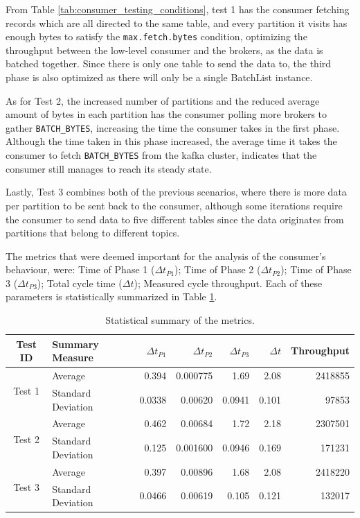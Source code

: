 From Table \ref{tab:consumer_testing_conditions}, test 1 has the consumer
fetching records which are all directed to the same table, and every partition
it visits has enough bytes to satisfy the \lstinline{max.fetch.bytes} condition,
optimizing the throughput between the low-level consumer and the brokers, as the
data is batched together. Since there is only one table to send the data to, the
third phase is also optimized as there will only be a single BatchList instance.

As for Test 2, the increased number of partitions and the reduced average amount
of bytes in each partition has the consumer polling more brokers to gather
\lstinline{BATCH_BYTES}, increasing the time the consumer takes in the first
phase. Although the time taken in this phase increased, the average time it takes
the consumer to fetch \lstinline{BATCH_BYTES} from the kafka cluster, indicates
that the consumer still manages to reach its steady state.

Lastly, Test 3 combines both of the previous scenarios, where there is more data
per partition to be sent back to the consumer, although some iterations require
the consumer to send data to five different tables since the data originates from
partitions that belong to different topics.

The metrics that were deemed important for the analysis of the consumer's
behaviour, were: Time of Phase 1 ($\Delta t_{P1}$); Time of Phase 2 ($\Delta
t_{P2}$); Time of Phase 3 ($\Delta t_{P3}$); Total cycle time ($\Delta t$);
Measured cycle throughput. Each of these parameters is statistically summarized
in Table \ref{tab:consumer_results}.
\begin{table}[htb!] 
\centering 
\caption{Statistical summary of the metrics.}
\label{tab:consumer_results}
    \begin{tabular}{ |c|l|r|r|r|r|r| } 
        \hline 
        \textbf{Test ID} & \textbf{Summary Measure} & \textbf{$\Delta t_{P1}$} &
            \textbf{$\Delta t_{P2}$} & \textbf{$\Delta t_{P3}$} & \textbf{$\Delta t$} & \textbf{Throughput} \\ 
            \hline
            \multirow{2}{*}{Test 1} 
            & Average & 0.394  & 0.000775 & 1.69 & 2.08 & 2418855 \\ 
            & Standard Deviation & 0.0338 & 0.00620  & 0.0941 & 0.101 & 97853 \\ 
            \hline 
            \multirow{2}{*}{Test 2} 
            & Average & 0.462 & 0.00684 & 1.72 & 2.18 & 2307501 \\ 
            & Standard Deviation & 0.125 & 0.001600  & 0.0946 & 0.169 & 171231 \\ 
            \hline \multirow{2}{*}{Test 3} 
            & Average & 0.397  & 0.00896 & 1.68 & 2.08 & 2418220 \\ 
            &  Standard Deviation & 0.0466 & 0.00619 & 0.105 & 0.121 & 132017 \\ 
    \hline 
    \end{tabular} 
\end{table}

